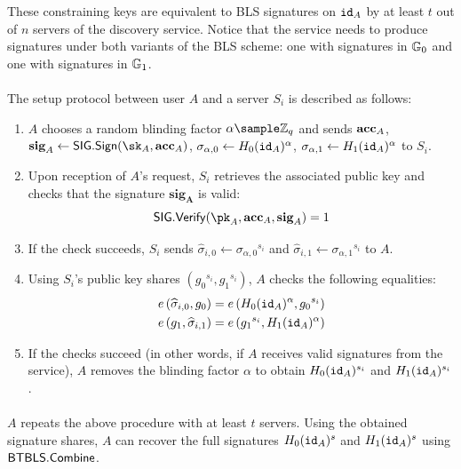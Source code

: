 		\noindent These constraining keys are equivalent to BLS signatures on $\mathtt{id}_A$ by at least $t$ out of $n$ servers of the discovery service. Notice that the service needs to produce signatures under both variants of the BLS scheme: one with signatures in $\mathbb{G}_0$ and one with signatures in $\mathbb{G}_1$.
		
		
		\paragraph{} The setup protocol between user $A$ and a server $S_i$ is described as follows:
		\begin{enumerate}
			\item $A$ chooses a random blinding factor $\alpha \sample \mathbb{Z}_q$ and sends $\mathbf{acc}_A$, $\mathbf{sig}_A \leftarrow \SIG.\Sign(\sk_A, \acc_A)$, $\sigma_{\alpha,0} \leftarrow H_0(\mathtt{id}_A)^\alpha$, $\sigma_{\alpha,1} \leftarrow H_1(\mathtt{id}_A)^\alpha$ to $S_i$.
			\item Upon reception of $A$'s request, $S_i$ retrieves the associated public key and checks that the signature $\mathbf{sig_A}$ is valid:
			\begin{equation}
				\SIG.\Verif(\pk_A, \acc_A, \mathbf{sig}_A) = 1
			\end{equation}
		\item If the check succeeds, $S_i$ sends $\widehat\sigma_{i,0} \leftarrow {\sigma_{\alpha,0}}^{s_i}$ and $\widehat\sigma_{i,1} \leftarrow {\sigma_{\alpha,1}}^{s_i}$ to $A$.
		\item Using $S_i$'s public key shares $({g_0}^{s_i}, {g_1}^{s_i})$, $A$ checks the following equalities:
		\begin{align}
			e\left(\widehat\sigma_{i,0}, g_0 \right) &= e\left(H_0(\mathtt{id}_A)^\alpha, {g_0}^{s_i} \right) \\
			e\left(g_1, \widehat\sigma_{i,1} \right) &= e\left({g_1}^{s_i}, H_1(\mathtt{id}_A)^\alpha \right)
		\end{align}
		\item If the checks succeed (in other words, if $A$ receives valid signatures from the service), $A$ removes the blinding factor $\alpha$ to obtain $H_0(\mathtt{id}_A)^{s_i}$ and $H_1(\mathtt{id}_A)^{s_i}$.
		\end{enumerate}
		
	
	\paragraph{} $A$ repeats the above procedure with at least $t$ servers. Using the obtained signature shares, $A$ can recover the full signatures $H_0(\mathtt{id}_A)^s$ and $H_1(\mathtt{id}_A)^s$ using $\mathsf{BTBLS}.\mathsf{Combine}$.
	


